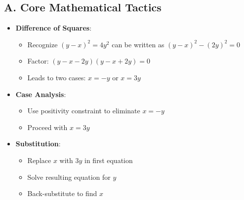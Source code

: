 \documentclass[12pt]{article}
\begin{document}
\begin{tacticalbox}
\subsection*{A. Core Mathematical Tactics}
\begin{itemize}[leftmargin=*]
    \item \textbf{Difference of Squares}: 
    \begin{itemize}
        \item Recognize $(y-x)^2 = 4y^2$ can be written as $(y-x)^2 - (2y)^2 = 0$
        \item Factor: $(y-x-2y)(y-x+2y) = 0$
        \item Leads to two cases: $x = -y$ or $x = 3y$
    \end{itemize}
    \item \textbf{Case Analysis}: 
    \begin{itemize}
        \item Use positivity constraint to eliminate $x = -y$
        \item Proceed with $x = 3y$
    \end{itemize}
    \item \textbf{Substitution}: 
    \begin{itemize}
        \item Replace $x$ with $3y$ in first equation
        \item Solve resulting equation for $y$
        \item Back-substitute to find $x$
    \end{itemize}
\end{itemize}


\end{tacticalbox}
\end{document}
